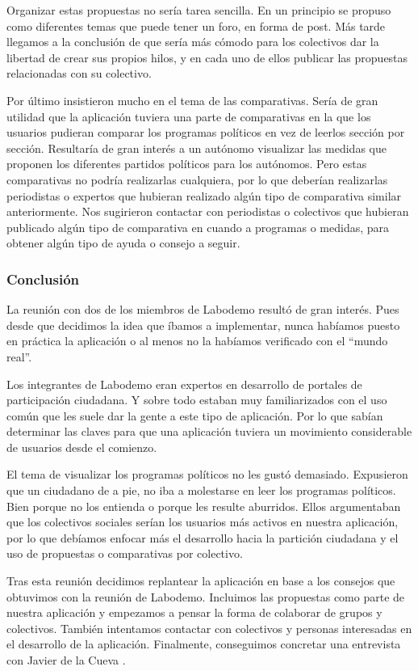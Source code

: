 Organizar estas propuestas no sería tarea sencilla. En un principio se propuso como diferentes temas que puede tener un foro, en forma de post. Más tarde llegamos a la conclusión de que sería más cómodo para los colectivos dar la libertad de crear sus propios hilos, y en cada uno de ellos publicar las propuestas relacionadas con su colectivo.

Por último insistieron mucho en el tema de las comparativas. Sería de gran utilidad que la aplicación tuviera una parte de comparativas en la que los usuarios pudieran comparar los programas políticos en vez de leerlos sección por sección. Resultaría de gran interés a un autónomo visualizar las medidas que proponen los diferentes partidos políticos para los autónomos. Pero estas comparativas no podría realizarlas cualquiera, por lo que deberían realizarlas periodistas o expertos que hubieran realizado algún tipo de comparativa similar anteriormente. Nos sugirieron contactar con periodistas o colectivos que hubieran publicado algún tipo de comparativa en cuando a programas o medidas, para obtener algún tipo de ayuda o consejo a seguir.

\subsubsection{Conclusión}
La reunión con dos de los miembros de Labodemo resultó de gran interés. Pues desde que decidimos la idea que íbamos a implementar, nunca habíamos puesto en práctica la aplicación o al menos no la habíamos verificado con el “mundo real”.

Los integrantes de Labodemo eran expertos en desarrollo de portales de participación ciudadana. Y sobre todo estaban muy familiarizados con el uso común que les suele dar la gente a este tipo de aplicación. Por lo que sabían determinar las claves para que una aplicación tuviera un movimiento considerable de usuarios desde el comienzo.

El tema de visualizar los programas políticos no les gustó demasiado. Expusieron que un ciudadano de a pie, no iba a molestarse en leer los programas políticos. Bien porque no los entienda o porque les resulte aburridos. Ellos argumentaban que los colectivos sociales serían los usuarios más activos en nuestra aplicación, por lo que debíamos enfocar más el desarrollo hacia la partición ciudadana y el uso de propuestas o comparativas por colectivo.

Tras esta reunión decidimos replantear la aplicación en base a los consejos que obtuvimos con la reunión de Labodemo. Incluimos las propuestas como parte de nuestra aplicación y empezamos a pensar la forma de colaborar de grupos y colectivos. También intentamos contactar con colectivos y personas interesadas en el desarrollo de la aplicación. Finalmente, conseguimos concretar una entrevista con Javier de la Cueva \cite{ref:jdelacueva}.

